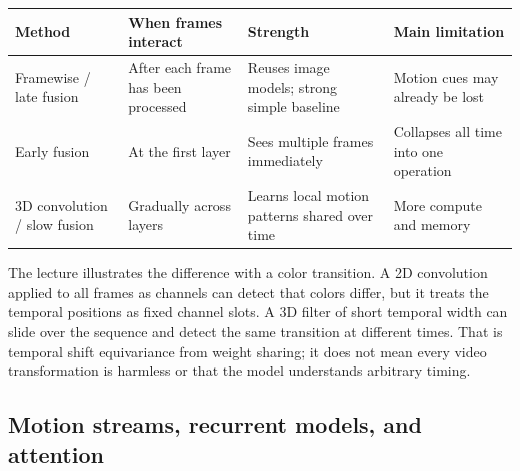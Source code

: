 {\def\LTcaptype{none} %
\begin{longtable}[]{@{}
  >{\raggedright\arraybackslash}p{}
  >{\raggedright\arraybackslash}p{}
  >{\raggedright\arraybackslash}p{}
  >{\raggedright\arraybackslash}p{}@{}}
\toprule\noalign{}
\begin{minipage}[b]{\linewidth}\raggedright
Method
\end{minipage} & \begin{minipage}[b]{\linewidth}\raggedright
When frames interact
\end{minipage} & \begin{minipage}[b]{\linewidth}\raggedright
Strength
\end{minipage} & \begin{minipage}[b]{\linewidth}\raggedright
Main limitation
\end{minipage} \\
\midrule\noalign{}
\endhead
\bottomrule\noalign{}
\endlastfoot
Framewise / late fusion & After each frame has been processed & Reuses image models; strong simple baseline & Motion cues may already be lost \\
Early fusion & At the first layer & Sees multiple frames immediately & Collapses all time into one operation \\
3D convolution / slow fusion & Gradually across layers & Learns local motion patterns shared over time & More compute and memory \\
\end{longtable}
}

The lecture illustrates the difference with a color transition. A 2D convolution applied to all frames as channels can detect that colors differ, but it treats the temporal positions as fixed channel slots. A 3D filter of short temporal width can slide over the sequence and detect the same transition at different times. That is temporal shift equivariance from weight sharing; it does not mean every video transformation is harmless or that the model understands arbitrary timing.

\subsection{Motion streams, recurrent models, and attention}\label{04-visual-computing-ii-ch031-motion-streams-recurrent-models-and-attention}

